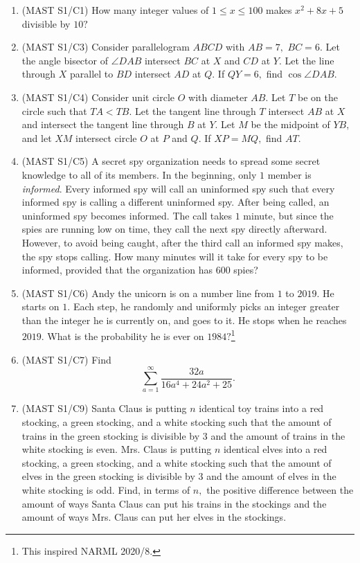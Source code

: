 \documentclass{article}
\begin{document}
\begin{enumerate}
\item (MAST S1/C1) How many integer values of $1\leq x\leq 100$ makes $x^2+8x+5$ divisible by $10?$

\item (MAST S1/C3) Consider parallelogram $ABCD$ with $AB=7,$ $BC=6.$ Let the angle bisector of $\angle DAB$ intersect $BC$ at $X$ and $CD$ at $Y.$ Let the line through $X$ parallel to $BD$ intersect $AD$ at $Q.$ If $QY=6,$ find $\cos\angle DAB.$

\item (MAST S1/C4) Consider unit circle $O$ with diameter $AB.$ Let $T$ be on the circle such that $TA<TB.$ Let the tangent line through $T$ intersect $AB$ at $X$ and intersect the tangent line through $B$ at $Y.$ Let $M$ be the midpoint of $YB,$ and let $XM$ intersect circle $O$ at $P$ and $Q.$ If $XP=MQ,$ find $AT.$

\item (MAST S1/C5) A secret spy organization needs to spread some secret knowledge to all of its members. In the beginning, only $1$ member is \textit{informed}. Every informed spy will call an uninformed spy such that every informed spy is calling a different uninformed spy. After being called, an uninformed spy becomes informed. The call takes $1$ minute, but since the spies are running low on time, they call the next spy directly afterward. However, to avoid being caught, after the third call an informed spy makes, the spy stops calling. How many minutes will it take for every spy to be informed, provided that the organization has $600$ spies?

\item (MAST S1/C6) Andy the unicorn is on a number line from $1$ to $2019.$ He starts on $1.$ Each step, he randomly and uniformly picks an integer greater than the integer he is currently on, and goes to it. He stops when he reaches $2019.$ What is the probability he is ever on $1984?$\footnote{This inspired NARML 2020/8.}

\item (MAST S1/C7) Find \[\sum\limits_{a=1}^{\infty}\frac{32a}{16a^4+24a^2+25}.\]

\item (MAST S1/C9) Santa Claus is putting $n$ identical toy trains into a red stocking, a green stocking, and a white stocking such that the amount of trains in the green stocking is divisible by $3$ and the amount of trains in the white stocking is even. Mrs. Claus is putting $n$ identical elves into a red stocking, a green stocking, and a white stocking such that the amount of elves in the green stocking is divisible by $3$ and the amount of elves in the white stocking is odd. Find, in terms of $n,$ the positive difference between the amount of ways Santa Claus can put his trains in the stockings and the amount of ways Mrs. Claus can put her elves in the stockings.


\end{enumerate}
\end{document}
